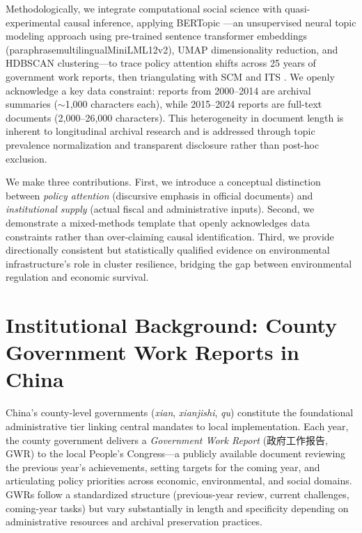 \documentclass[sustainability,article,submit,moreauthors,pdftex]{mdpi}
\begin{document}
Methodologically, we integrate computational social science with quasi-experimental causal inference, applying BERTopic \citep{Grootendorst2022}---an unsupervised neural topic modeling approach using pre-trained sentence transformer embeddings (paraphrase\-multilingual\-MiniLM\-L12\-v2), UMAP dimensionality reduction, and HDBSCAN clustering---to trace policy attention shifts across 25 years of government work reports, then triangulating with SCM \citep{Abadie2010} and ITS \citep{Bernal2017}. We openly acknowledge a key data constraint: reports from 2000--2014 are archival summaries ($\sim$1,000 characters each), while 2015--2024 reports are full-text documents (2,000--26,000 characters). This heterogeneity in document length is inherent to longitudinal archival research and is addressed through topic prevalence normalization and transparent disclosure rather than post-hoc exclusion.

We make three contributions. First, we introduce a conceptual distinction between \emph{policy attention} (discursive emphasis in official documents) and \emph{institutional supply} (actual fiscal and administrative inputs). Second, we demonstrate a mixed-methods template that openly acknowledges data constraints rather than over-claiming causal identification. Third, we provide directionally consistent but statistically qualified evidence on environmental infrastructure's role in cluster resilience, bridging the gap between environmental regulation and economic survival.
\section{Institutional Background: County Government Work Reports in China}\label{sec:background}

China's county-level governments (\emph{xian}, \emph{xianjishi}, \emph{qu}) constitute the foundational administrative tier linking central mandates to local implementation. Each year, the county government delivers a \emph{Government Work Report} (政府工作报告, GWR) to the local People's Congress---a publicly available document reviewing the previous year's achievements, setting targets for the coming year, and articulating policy priorities across economic, environmental, and social domains. GWRs follow a standardized structure (previous-year review, current challenges, coming-year tasks) but vary substantially in length and specificity depending on administrative resources and archival preservation practices.
\end{document}
